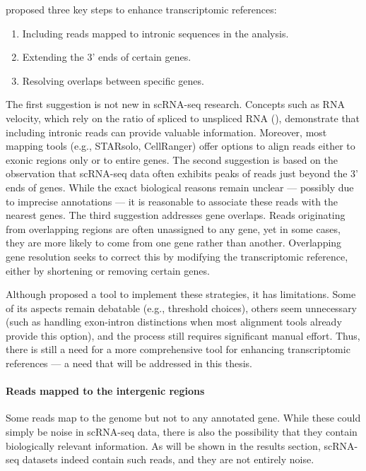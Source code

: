 \textcite{Pool2023} proposed three key steps to enhance transcriptomic references:
\begin{enumerate}
  \item Including reads mapped to intronic sequences in the analysis.
  \item Extending the 3' ends of certain genes.
  \item Resolving overlaps between specific genes.
\end{enumerate}
The first suggestion is not new in scRNA-seq research.
Concepts such as RNA velocity, which rely on the ratio of spliced to unspliced RNA (\cite{Manno2018}),
demonstrate that including intronic reads can provide valuable information.
Moreover, most mapping tools (e.g., STARsolo, CellRanger) offer options to align reads either to exonic regions only or to entire genes.
The second suggestion is based on the observation that scRNA-seq data often exhibits peaks of reads just beyond the 3' ends of genes.
While the exact biological reasons remain unclear — possibly due to imprecise annotations —
it is reasonable to associate these reads with the nearest genes.
The third suggestion addresses gene overlaps.
Reads originating from overlapping regions are often unassigned to any gene,
yet in some cases, they are more likely to come from one gene rather than another.
Overlapping gene resolution seeks to correct this by modifying the transcriptomic reference, either by shortening or removing certain genes.

Although \textcite{Pool2023} proposed a tool to implement these strategies, it has limitations.
Some of its aspects remain debatable (e.g., threshold choices), others seem unnecessary
(such as handling exon-intron distinctions when most alignment tools already provide this option),
and the process still requires significant manual effort.
Thus, there is still a need for a more comprehensive tool for enhancing transcriptomic references — a need that will be addressed in this thesis.

\paragraph{Reads mapped to the intergenic regions}
Some reads map to the genome but not to any annotated gene.
While these could simply be noise in scRNA-seq data, there is also the possibility that they contain biologically relevant information.
As will be shown in the results section, scRNA-seq datasets indeed contain such reads, and they are not entirely noise.































